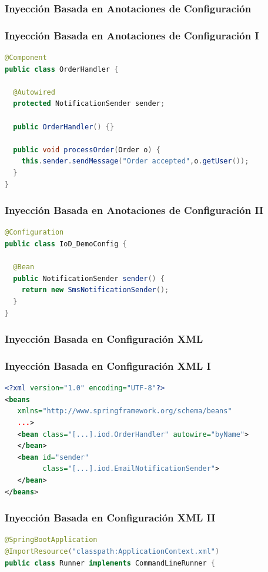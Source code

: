 \documentclass[handout,a4paper,t,xcolor=pst,dvips,colortheme]{beamer}
\begin{document}
\subsubsection{Inyección Basada en Anotaciones de Configuración}

\begin{frame}[c,fragile]
	\frametitle{Inyección Basada en Anotaciones de Configuración I}
\begin{lstlisting}[basicstyle=\footnotesize,language=Java]
@Component
public class OrderHandler {

  @Autowired
  protected NotificationSender sender;
	
  public OrderHandler() {}
	
  public void processOrder(Order o) {
    this.sender.sendMessage("Order accepted",o.getUser());
  }
}
\end{lstlisting}
\end{frame}

\begin{frame}[c,fragile]
	\frametitle{Inyección Basada en Anotaciones de Configuración II}
\begin{lstlisting}[basicstyle=\footnotesize,language=Java]
@Configuration
public class IoD_DemoConfig {
	
  @Bean
  public NotificationSender sender() {
    return new SmsNotificationSender();
  }
}
\end{lstlisting}
\end{frame}

\subsubsection{Inyección Basada en Configuración XML}

\begin{frame}[c,fragile]
	\frametitle{Inyección Basada en Configuración XML I}
\begin{lstlisting}[basicstyle=\footnotesize,language=XML]
<?xml version="1.0" encoding="UTF-8"?>
<beans
   xmlns="http://www.springframework.org/schema/beans"
   ...>
   <bean class="[...].iod.OrderHandler" autowire="byName">
   </bean>
   <bean id="sender"
         class="[...].iod.EmailNotificationSender">
   </bean>
</beans>
\end{lstlisting}
\end{frame}

\begin{frame}[c,fragile]
	\frametitle{Inyección Basada en Configuración XML II}
\begin{lstlisting}[basicstyle=\footnotesize,language=Java]
@SpringBootApplication
@ImportResource("classpath:ApplicationContext.xml")
public class Runner implements CommandLineRunner {
\end{lstlisting}
\end{frame}
\end{document}

